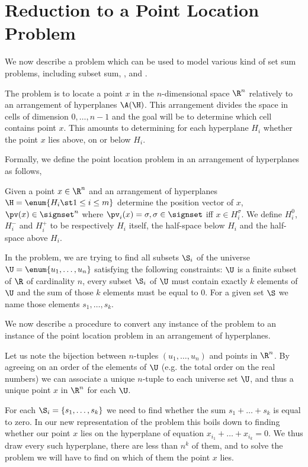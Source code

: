 \section{Reduction to a Point Location Problem}

We now describe a problem which can be used to model
various kind of set sum problems, including subset sum, \kSUM, and \kLDT.

The problem is to locate a point \(x\) in the \(n\)-dimensional space \(\R^n\) relatively
to an arrangement of hyperplanes \(\A(\H)\). This arrangement divides the space
in cells of dimension \(0,\ldots,n-1\) and the goal will be to determine which
cell contains point \(x\). This amounts to determining for each
hyperplane \(H_i\) whether the point \(x\) lies above, on or below \(H_i\).

Formally, we define the point location problem in an arrangement of hyperplanes as
follows,

\begin{problem}
Given a point $x \in \R^n$ and an arrangement of hyperplanes $\H = \enum{ H_i
\st 1 \leq i \leq m }$ determine the position vector of $x$, $\pv(x) \in
\signset^n$ where $\pv_i(x) = \sigma, \sigma \in \signset$ iff $x \in
H_i^{\sigma}$. We define $H_i^{0}$, $H_i^{-}$ and $H_i^{+}$ to be
respectively $H_i$ itself, the half-space below $H_i$ and the half-space above
$H_i$.
\end{problem}

In the \kSUM problem, we are trying to find all subsets \(\S_i\) of the
universe \(\U = \enum{u_1,\ldots,u_n}\) satisfying the following constraints:
\(\U\) is a finite subset of \(\R\) of cardinality \(n\), every subset $\S_i$
of $\U$ must contain exactly $k$ elements of $\U$ and the sum of those $k$
elements must be equal to $0$. For a given set $\S$ we name those elements
$s_1, \dots, s_k$.

We now describe a procedure to convert any instance of the \kSUM problem to an
instance of the point location problem in an arrangement of hyperplanes.

Let us note the bijection between $n$-tuples $(u_1, \ldots, u_n)$ and points in
$\R^n$. By agreeing on an order of the elements of $\U$ (e.g. the total order on
the real numbers) we can associate a unique $n$-tuple to each universe set $\U$,
and thus a unique point $x$ in $\R^n$ for each $\U$.

For each $\S_i = \left\{s_1, \dots, s_k\right\}$ we need to find whether the sum $s_1
+ \dots + s_k$ is equal to zero. In our new representation of the problem this
boils down to finding whether our point $x$ lies on the hyperplane of
equation $x_{i_1} + \dots + x_{i_k} = 0$. We thus draw every such hyperplane,
there are less than $n^k$ of them, and to solve the problem
we will have to find on which of them the point $x$ lies.

